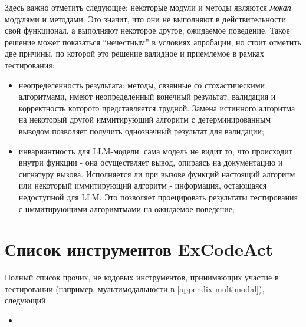 Здесь важно отметить следующее: некоторые модули и методы являются \textit{мокап} модулями и методами. Это значит,
что они не выполняют в действительности свой функционал, а выполняют некоторое другое, ожидаемое поведение.
Такое решение может показаться ``нечестным'' в условиях апробации, но стоит отметить две причины, по которой
это решение валидное и приемлемое в рамках тестирования:
\begin{itemize}
	\item неопределенность результата: методы, свзянные со стохастическими алгоритмами, имеют неопределенный 
конечный результат, валидация и корректность которого представляется трудной. Замена истинного алгоритма на 
некоторый другой иммитирующий алгоритм с детерминированным выводом позволяет получить однозначный результат для
валидации;
	\item инвариантность для LLM-модели: сама модель не видит то, что происходит внутри функции - она 
осуществляет вывод, опираясь на документацию и сигнатуру вызова. Исполняется ли при вызове функций настоящий
алгоритм или некоторый иммитирующий алгоритм - информация, остающаяся недоступной для LLM. Это позволяет 
проецировать результаты тестирования с иммитирующими алгоримтмами на ожидаемое поведение;
\end{itemize}

\section{Список инструментов ExCodeAct}\label{appendix-tools:sec2}

Полный список прочих, не кодовых инструментов, принимающих участие в тестировании
(например, мультимодальности в \ref{appendix-multimodal}), следующий:
\begin{itemize}
	\item 
\end{itemize}
